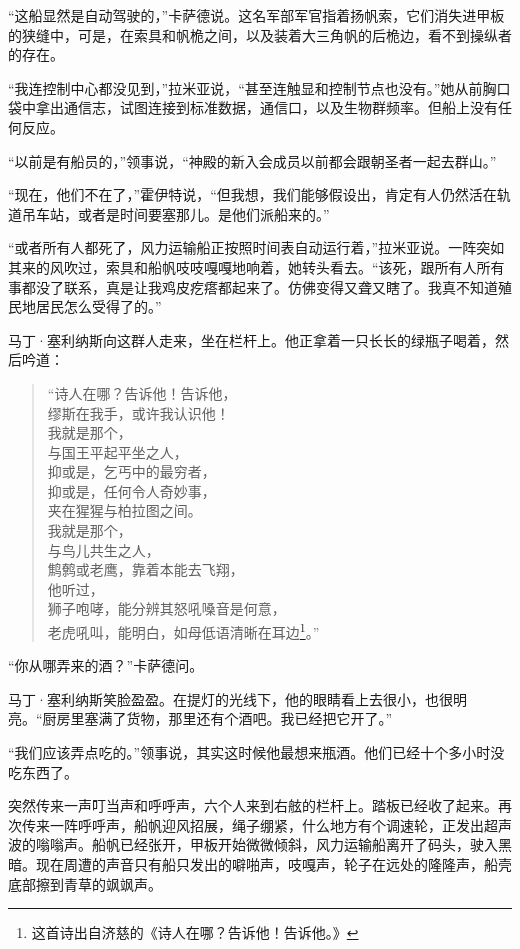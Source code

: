 \documentclass[AutoFakeBold=true]{book}
\begin{document}
``这船显然是自动驾驶的，''卡萨德说。这名军部军官指着扬帆索，它们消失进甲板的狭缝中，可是，在索具和帆桅之间，以及装着大三角帆的后桅边，看不到操纵者的存在。

``我连控制中心都没见到，''拉米亚说，``甚至连触显和控制节点也没有。''她从前胸口袋中拿出通信志，试图连接到标准数据，通信口，以及生物群频率。但船上没有任何反应。

``以前是有船员的，''领事说，``神殿的新入会成员以前都会跟朝圣者一起去群山。''

``现在，他们不在了，''霍伊特说，``但我想，我们能够假设出，肯定有人仍然活在轨道吊车站，或者是时间要塞那儿。是他们派船来的。''

``或者所有人都死了，风力运输船正按照时间表自动运行着，''拉米亚说。一阵突如其来的风吹过，索具和船帆吱吱嘎嘎地响着，她转头看去。``该死，跟所有人所有事都没了联系，真是让我鸡皮疙瘩都起来了。仿佛变得又聋又瞎了。我真不知道殖民地居民怎么受得了的。''

马丁·塞利纳斯向这群人走来，坐在栏杆上。他正拿着一只长长的绿瓶子喝着，然后吟道：

\begin{quote}
	{\kaishu ``诗人在哪？告诉他！告诉他，\\
	缪斯在我手，或许我认识他！\\
	我就是那个，\\
	与国王平起平坐之人，\\
	抑或是，乞丐中的最穷者，\\
	抑或是，任何令人奇妙事，\\
	夹在猩猩与柏拉图之间。\\
	我就是那个，\\
	与鸟儿共生之人，\\
	鹪鹩或老鹰，靠着本能去飞翔，\\
	他听过，\\
	狮子咆哮，能分辨其怒吼嗓音是何意，\\
	老虎吼叫，能明白，如母低语清晰在耳边}\footnote{这首诗出自济慈的《诗人在哪？告诉他！告诉他。》}。''
\end{quote}

``你从哪弄来的酒？''卡萨德问。

马丁·塞利纳斯笑脸盈盈。在提灯的光线下，他的眼睛看上去很小，也很明亮。``厨房里塞满了货物，那里还有个酒吧。我已经把它开了。''

``我们应该弄点吃的。''领事说，其实这时候他最想来瓶酒。他们已经十个多小时没吃东西了。

突然传来一声叮当声和呼呼声，六个人来到右舷的栏杆上。踏板已经收了起来。再次传来一阵呼呼声，船帆迎风招展，绳子绷紧，什么地方有个调速轮，正发出超声波的嗡嗡声。船帆已经张开，甲板开始微微倾斜，风力运输船离开了码头，驶入黑暗。现在周遭的声音只有船只发出的噼啪声，吱嘎声，轮子在远处的隆隆声，船壳底部擦到青草的飒飒声。
\end{document}
